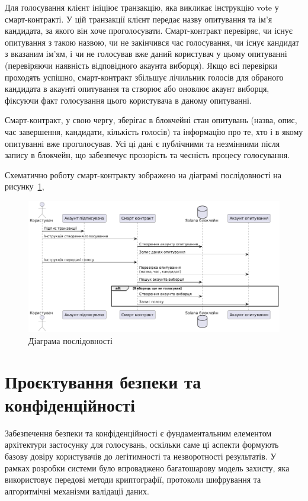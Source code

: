 \documentclass[14pt]{extreport}
\begin{document}
  Для голосування клієнт ініціює транзакцію, яка викликає інструкцію vote у смарт-контракті. У цій транзакції клієнт передає назву опитування та ім'я кандидата, за якого він хоче проголосувати. Смарт-контракт перевіряє, чи існує опитування з такою назвою, чи не закінчився час голосування, чи існує кандидат з вказаним ім'ям, і чи не голосував вже даний користувач у цьому опитуванні (перевіряючи наявність відповідного акаунта виборця). Якщо всі перевірки проходять успішно, смарт-контракт збільшує лічильник голосів для обраного кандидата в акаунті опитування та створює або оновлює акаунт виборця, фіксуючи факт голосування цього користувача в даному опитуванні.
  
  Смарт-контракт, у свою чергу, зберігає в блокчейні стан опитувань (назва, опис, час завершення, кандидати, кількість голосів) та інформацію про те, хто і в якому опитуванні вже проголосував. Усі ці дані є публічними та незмінними після запису в блокчейн, що забезпечує прозорість та чесність процесу голосування.
  
  Схематично роботу смарт-контракту зображено на діаграмі послідовності на рисунку~\ref{fig:UMLSequence},
  
  \begin{figure}[H]
    \centering
    \includegraphics[scale=0.5]{UMLSequence}
    \caption{Діаграма послідовності}
    \label{fig:UMLSequence}
  \end{figure}
  
  \section{Проєктування безпеки та конфіденційності}
  
  Забезпечення безпеки та конфіденційності є фундаментальним елементом архітектури застосунку для голосувань, оскільки саме ці аспекти формують базову довіру користувачів до легітимності та незворотності результатів. У рамках розробки системи було впроваджено багатошарову модель захисту, яка використовує передові методи криптографії, протоколи шифрування та алгоритмічні механізми валідації даних.
\end{document}

